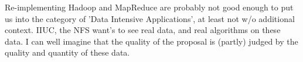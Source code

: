 \documentclass[10pt,letterpaper]{article}
\begin{document}
Re-implementing Hadoop and MapReduce are probably not good
enough to put us into the category of 'Data Intensive
Applications', at least not w/o additional context.  IIUC,
the NFS want's to see real data, and real algorithms on
these data.  I can well imagine that the quality of the
proposal is (partly) judged by the quality and quantity of
these data.





\end{document}
